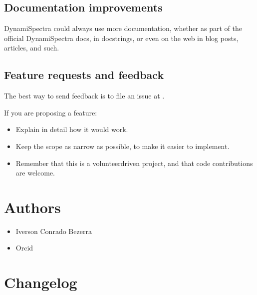 \documentclass[a4paper,10pt,english]{sphinxmanual}
\begin{document}
\section{Documentation improvements}
\label{\detokenize{Contributing:documentation-improvements}}
\sphinxAtStartPar
DynamiSpectra could always use more documentation, whether as part of the
official DynamiSpectra docs, in docstrings, or even on the web in blog posts,
articles, and such.


\section{Feature requests and feedback}
\label{\detokenize{Contributing:feature-requests-and-feedback}}
\sphinxAtStartPar
The best way to send feedback is to file an issue at .

\sphinxAtStartPar
If you are proposing a feature:
\begin{itemize}
\item {} 
\sphinxAtStartPar
Explain in detail how it would work.

\item {} 
\sphinxAtStartPar
Keep the scope as narrow as possible, to make it easier to implement.

\item {} 
\sphinxAtStartPar
Remember that this is a volunteer\sphinxhyphen{}driven project, and that code contributions are welcome.

\end{itemize}

\sphinxstepscope


\chapter{Authors}
\label{\detokenize{Authors:authors}}\label{\detokenize{Authors::doc}}\begin{itemize}
\item {} 
\sphinxAtStartPar
Iverson Conrado Bezerra \sphinxhyphen{} 

\item {} 
\sphinxAtStartPar
Orcid \sphinxhyphen{} 

\end{itemize}

\sphinxstepscope


\chapter{Changelog}
\label{\detokenize{Changelog:changelog}}\label{\detokenize{Changelog::doc}}
\end{document}
